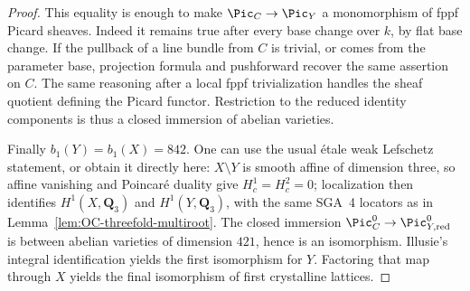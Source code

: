\begin{proof}
This equality is enough to make $\Pic_C\to\Pic_Y$ a monomorphism of fppf Picard sheaves.  Indeed it remains true after every base change over $k$, by flat base change.  If the pullback of a line bundle from $C$ is trivial, or comes from the parameter base, projection formula and pushforward recover the same assertion on $C$.  The same reasoning after a local fppf trivialization handles the sheaf quotient defining the Picard functor.  Restriction to the reduced identity components is thus a closed immersion of abelian varieties.

Finally $b_1(Y)=b_1(X)=842$.  One can use the usual \'etale weak Lefschetz statement, or obtain it directly here: $X\setminus Y$ is smooth affine of dimension three, so affine vanishing and Poincar\'e duality give $H_c^1=H_c^2=0$; localization then identifies $H^1(X,\mathbf Q_3)$ and $H^1(Y,\mathbf Q_3)$, with the same SGA~4 locators as in Lemma~\ref{lem:OC-threefold-multiroot}.  The closed immersion $\Pic_C^0\to\Pic^0_{Y,\mathrm{red}}$ is between abelian varieties of dimension $421$, hence is an isomorphism.  Illusie's integral identification yields the first isomorphism for $Y$.  Factoring that map through $X$ yields the final isomorphism of first crystalline lattices.
\end{proof}

